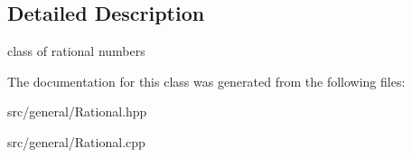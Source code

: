 \subsection{Detailed Description}
class of rational numbers 

The documentation for this class was generated from the following files\+:\begin{DoxyCompactItemize}
\item 
src/general/Rational.\+hpp\item 
src/general/Rational.\+cpp\end{DoxyCompactItemize}
